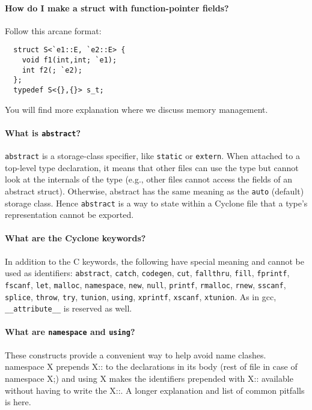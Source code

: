 \paragraph{How do I make a struct with function-pointer fields?}

Follow this arcane format:
\begin{verbatim}
  struct S<`e1::E, `e2::E> {
    void f1(int,int; `e1);
    int f2(; `e2);
  };
  typedef S<{},{}> s_t;
\end{verbatim}
You will find more explanation where we discuss memory management.

\paragraph{What is \texttt{abstract}?}

\texttt{abstract} is a storage-class specifier, like \texttt{static}
or \texttt{extern}.  When attached to a top-level type declaration, it
means that other files can use the type but cannot look at the
internals of the type (e.g., other files cannot access the fields of
an abstract struct).  Otherwise, abstract has the same meaning as the
\texttt{auto} (default) storage class.  Hence \texttt{abstract} is a
way to state within a Cyclone file that a type's representation cannot
be exported.

\paragraph{What are the Cyclone keywords?}

In addition to the C keywords, the following have special meaning and
cannot be used as identifiers: \texttt{abstract}, \texttt{catch},
\texttt{codegen}, \texttt{cut}, \texttt{fallthru}, \texttt{fill},
\texttt{fprintf}, \texttt{fscanf}, \texttt{let}, \texttt{malloc},
\texttt{namespace}, \texttt{new}, \texttt{null}, \texttt{printf},
\texttt{rmalloc}, \texttt{rnew}, \texttt{sscanf}, \texttt{splice},
\texttt{throw}, \texttt{try}, \texttt{tunion}, \texttt{using},
\texttt{xprintf}, \texttt{xscanf}, \texttt{xtunion}.  As in gcc,
\texttt{__attribute__} is reserved as well.

\paragraph{What are \texttt{namespace} and \texttt{using}?}

These constructs provide a convenient way to help avoid name clashes.
namespace X prepends X:: to the declarations in its body (rest of file
in case of namespace X;) and using X makes the identifiers prepended
with X:: available without having to write the X::.  A longer
explanation and list of common pitfalls is here.

